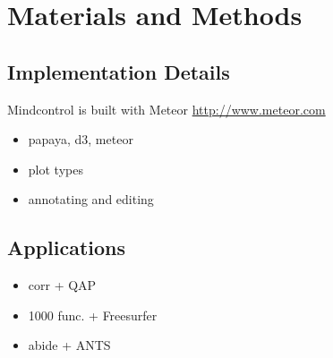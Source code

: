 \section{Materials and Methods}

\subsection{Implementation Details}

Mindcontrol is built with Meteor \href{http://www.meteor.com}{http://www.meteor.com}

\begin{itemize}
\item papaya, d3, meteor
\item plot types
\item annotating and editing
\end{itemize}

\subsection{Applications}

\begin{itemize}
\item corr + QAP
\item 1000 func. + Freesurfer
\item abide + ANTS
\end{itemize}

